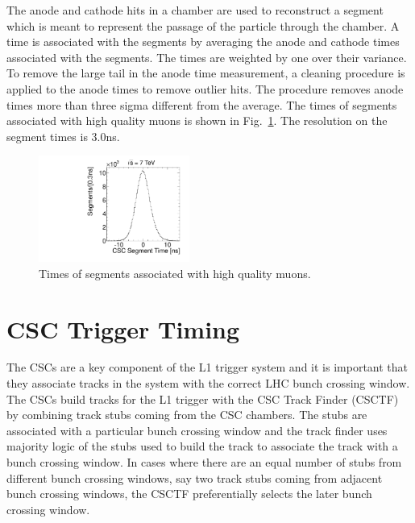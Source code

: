The anode and cathode hits in a chamber are used to reconstruct a segment which is meant to represent the passage of the particle through the chamber. A time is
associated with the segments by averaging the anode and cathode times associated with the segments. The times are weighted by one over their variance.
To remove the large tail in the anode time measurement,
a cleaning procedure is applied to the anode times to remove outlier hits. The procedure removes anode times more than three
sigma different from the average. The times of segments associated with high quality muons is shown in Fig.~\ref{fig:SegTimes}. The resolution on the segment times is 3.0ns.

\begin{figure}
  \begin{center}
      \includegraphics[width=0.44\textwidth]{figures/timing/StripAndWireSegmentTime}
      \caption[Distribution of times of segments associated with high quality muons]
      {Times of segments associated with high quality muons.
        }
      \label{fig:SegTimes}
  \end{center}
\end{figure}

\section{CSC Trigger Timing}

The CSCs are a key component of the L1 trigger system and it is important that they associate tracks in the system with the correct LHC bunch crossing window.
The CSCs build tracks for the L1 trigger with the CSC Track Finder (CSCTF) by combining track stubs coming from the CSC chambers. 
The stubs are associated with a particular bunch crossing window and
the track finder uses majority logic of the stubs used to build the track to associate the track with a bunch crossing window. In cases where there are an equal number
of stubs from different bunch crossing windows, say two track stubs coming from adjacent bunch crossing windows, the CSCTF preferentially selects the later bunch crossing window.

